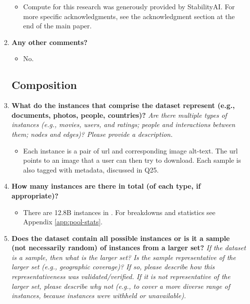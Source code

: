 \begin{enumerate}[label=Q\arabic*]
\begin{itemize}
\item Compute for this research was generously provided by StabilityAI. For more specific acknowledgments, see the acknowledgment section at the end of the main paper.
\end{itemize}

\item \textbf{Any other comments?}

\begin{itemize}
\item No.
\end{itemize}

\subsection{Composition}

\item \textbf{What do the instances that comprise the dataset represent (e.g., documents, photos, people, countries)?} \textit{Are there multiple types of instances (e.g., movies, users, and ratings; people and interactions between them; nodes and edges)? Please provide a description.}

\begin{itemize}
\item Each instance is a pair of url and corresponding image alt-text. The url points to an image that a user can then try to download. Each sample is also tagged with metadata, discussed in Q25.
\end{itemize}

\item \textbf{How many instances are there in total (of each type, if appropriate)?}

\begin{itemize}
\item There are 12.8B instances in \pool. For breakdowns and statistics see Appendix \ref{app:pool-stats}.
\end{itemize}

\item \textbf{Does the dataset contain all possible instances or is it a sample (not necessarily random) of instances from a larger set?} \textit{If the dataset is a sample, then what is the larger set? Is the sample representative of the larger set (e.g., geographic coverage)? If so, please describe how this representativeness was validated/verified. If it is not representative of the larger set, please describe why not (e.g., to cover a more diverse range of instances, because instances were withheld or unavailable).}


\end{enumerate}
